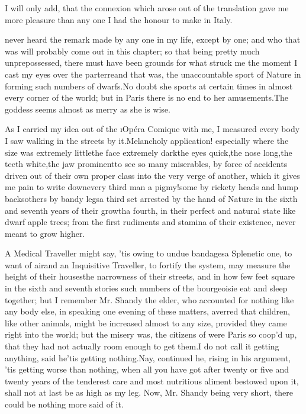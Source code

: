 \documentclass[twoside]{article}
\begin{document}
I will only add, that the connexion which arose out of the translation
gave me more pleasure than any one I had the honour to make in Italy.






 never heard the remark made by any one in my life, except by one;
and who that was will probably come out in this chapter; so that being
pretty much unprepossessed, there must have been grounds for what struck
me the moment I cast my eyes over the parterre\tsk and that was, the
unaccountable sport of Nature in forming such numbers of dwarfs.\tsk No doubt
she sports at certain times in almost every corner of the world; but in
Paris there is no end to her amusements.\tsk The goddess seems almost as
merry as she is wise.

As I carried my idea out of the \i{Opéra Comique} with me, I measured every
body I saw walking in the streets by it.\tsk Melancholy application!
especially where the size was extremely little\tsk the face extremely
dark\tsk the eyes quick,\tsk the nose long,\tsk the teeth white,\tsk the jaw
prominent\tsk to see so many miserables, by force of accidents driven out of
their own proper class into the very verge of another, which it gives me
pain to write down\tsk every third man a pigmy!\tsk some by rickety heads and
hump backs\tsk others by bandy legs\tsk a third set arrested by the hand of
Nature in the sixth and seventh years of their growth\tsk a fourth, in their
perfect and natural state like dwarf apple trees; from the first
rudiments and stamina of their existence, never meant to grow higher.

A Medical Traveller might say, ’tis owing to undue bandages\tsk a Splenetic
one, to want of air\tsk and an Inquisitive Traveller, to fortify the system,
may measure the height of their houses\tsk the narrowness of their streets,
and in how few feet square in the sixth and seventh stories such numbers
of the bourgeoisie eat and sleep together; but I remember Mr. Shandy the
elder, who accounted for nothing like any body else, in speaking one
evening of these matters, averred that children, like other animals,
might be increased almost to any size, provided they came right into the
world; but the misery was, the citizens of were Paris so coop’d up, that
they had not actually room enough to get them.\tsk I do not call it getting
anything, said he\tsk ’tis getting nothing.\tsk Nay, continued he, rising in his
argument, ’tis getting worse than nothing, when all you have got after
twenty or five and twenty years of the tenderest care and most nutritious
aliment bestowed upon it, shall not at last be as high as my leg.  Now,
Mr. Shandy being very short, there could be nothing more said of it.
\end{document}
